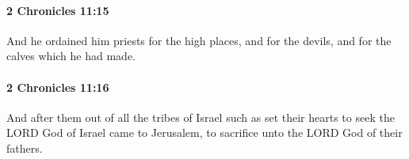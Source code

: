		\paragraph{2 Chronicles 11:15} %
			\label{2CHRONICLES-11-15}

			And he ordained him priests for the high places, and for the devils, and for the calves which he had made.


		\paragraph{2 Chronicles 11:16} %
			\label{2CHRONICLES-11-16}

			And after them out of all the tribes of Israel such as set their hearts to seek the LORD God of Israel came to Jerusalem, to sacrifice unto the LORD God of their fathers.


